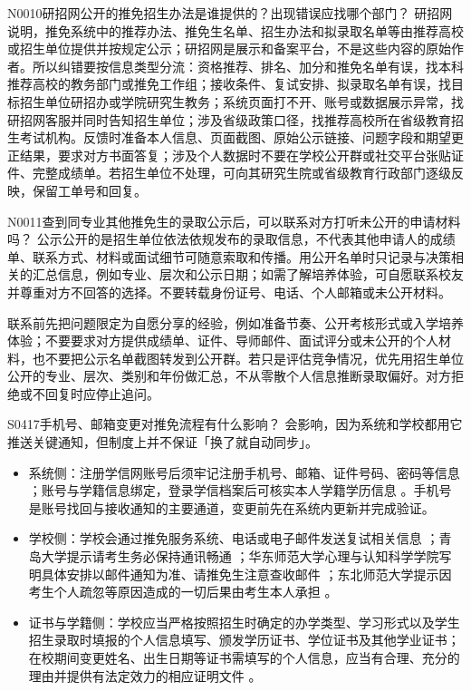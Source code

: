 \begin{qa}{N0010}{研招网公开的推免招生办法是谁提供的？出现错误应找哪个部门？}
研招网说明，推免系统中的推荐办法、推免生名单、招生办法和拟录取名单等由推荐高校或招生单位提供并按规定公示；研招网是展示和备案平台，不是这些内容的原始作者。所以纠错要按信息类型分流：资格推荐、排名、加分和推免名单有误，找本科推荐高校的教务部门或推免工作组；接收条件、复试安排、拟录取名单有误，找目标招生单位研招办或学院研究生教务；系统页面打不开、账号或数据展示异常，找研招网客服并同时告知招生单位；涉及省级政策口径，找推荐高校所在省级教育招生考试机构。反馈时准备本人信息、页面截图、原始公示链接、问题字段和期望更正结果，要求对方书面答复；涉及个人数据时不要在学校公开群或社交平台张贴证件、完整成绩单。若招生单位不处理，可向其研究生院或省级教育行政部门逐级反映，保留工单号和回复。
\end{qa}

\begin{qa}{N0011}{查到同专业其他推免生的录取公示后，可以联系对方打听未公开的申请材料吗？}
公示公开的是招生单位依法依规发布的录取信息，不代表其他申请人的成绩单、联系方式、材料或面试细节可随意索取和传播。用公开名单时只记录与决策相关的汇总信息，例如专业、层次和公示日期；如需了解培养体验，可自愿联系校友并尊重对方不回答的选择。不要转载身份证号、电话、个人邮箱或未公开材料。

联系前先把问题限定为自愿分享的经验，例如准备节奏、公开考核形式或入学培养体验；不要要求对方提供成绩单、证件、导师邮件、面试评分或未公开的个人材料，也不要把公示名单截图转发到公开群。若只是评估竞争情况，优先用招生单位公开的专业、层次、类别和年份做汇总，不从零散个人信息推断录取偏好。对方拒绝或不回复时应停止追问。
\end{qa}
\begin{qa}{S0417}{手机号、邮箱变更对推免流程有什么影响？}
会影响，因为系统和学校都用它推送关键通知，但制度上并不保证「换了就自动同步」。
\begin{itemize}
  \item 系统侧：注册学信网账号后须牢记注册手机号、邮箱、证件号码、密码等信息 ；账号与学籍信息绑定，登录学信档案后可核实本人学籍学历信息 。手机号是账号找回与接收通知的主要通道，变更前先在系统内更新并完成验证。
  \item 学校侧：学校会通过推免服务系统、电话或电子邮件发送复试相关信息 ；青岛大学提示请考生务必保持通讯畅通 ；华东师范大学心理与认知科学学院写明具体安排以邮件通知为准、请推免生注意查收邮件 ；东北师范大学提示因考生个人疏忽等原因造成的一切后果由考生本人承担 。
  \item 证书与学籍侧：学校应当严格按照招生时确定的办学类型、学习形式以及学生招生录取时填报的个人信息填写、颁发学历证书、学位证书及其他学业证书；在校期间变更姓名、出生日期等证书需填写的个人信息，应当有合理、充分的理由并提供有法定效力的相应证明文件 。
\end{itemize}
\end{qa}

